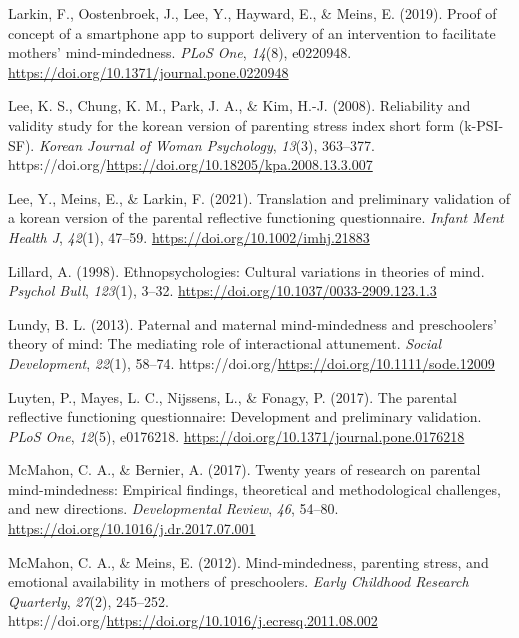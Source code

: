 \documentclass[
]{article}
\newlength{\cslhangindent}
\newlength{\cslentryspacingunit} %
\newenvironment{CSLReferences}[2] %
 {%
  \setlength{\parindent}{0pt}
  \ifodd #1
  \let\oldpar\par
  \def\par{\hangindent=\cslhangindent\oldpar}
  \fi
  \setlength{\parskip}{#2\cslentryspacingunit}
 }%
 {}
\begin{document}
\begin{CSLReferences}{1}{0}
\leavevmode{}%
Larkin, F., Oostenbroek, J., Lee, Y., Hayward, E., \& Meins, E. (2019). Proof of concept of a smartphone app to support delivery of an intervention to facilitate mothers' mind-mindedness. \emph{PLoS One}, \emph{14}(8), e0220948. \url{https://doi.org/10.1371/journal.pone.0220948}

\leavevmode{}%
Lee, K. S., Chung, K. M., Park, J. A., \& Kim, H.-J. (2008). Reliability and validity study for the korean version of parenting stress index short form (k-PSI-SF). \emph{Korean Journal of Woman Psychology}, \emph{13}(3), 363--377. https://doi.org/\url{https://doi.org/10.18205/kpa.2008.13.3.007}

\leavevmode{}%
Lee, Y., Meins, E., \& Larkin, F. (2021). Translation and preliminary validation of a korean version of the parental reflective functioning questionnaire. \emph{Infant Ment Health J}, \emph{42}(1), 47--59. \url{https://doi.org/10.1002/imhj.21883}

\leavevmode{}%
Lillard, A. (1998). Ethnopsychologies: Cultural variations in theories of mind. \emph{Psychol Bull}, \emph{123}(1), 3--32. \url{https://doi.org/10.1037/0033-2909.123.1.3}

\leavevmode{}%
Lundy, B. L. (2013). Paternal and maternal mind-mindedness and preschoolers' theory of mind: The mediating role of interactional attunement. \emph{Social Development}, \emph{22}(1), 58--74. https://doi.org/\url{https://doi.org/10.1111/sode.12009}

\leavevmode{}%
Luyten, P., Mayes, L. C., Nijssens, L., \& Fonagy, P. (2017). The parental reflective functioning questionnaire: Development and preliminary validation. \emph{PLoS One}, \emph{12}(5), e0176218. \url{https://doi.org/10.1371/journal.pone.0176218}

\leavevmode{}%
McMahon, C. A., \& Bernier, A. (2017). Twenty years of research on parental mind-mindedness: Empirical findings, theoretical and methodological challenges, and new directions. \emph{Developmental Review}, \emph{46}, 54--80. \url{https://doi.org/10.1016/j.dr.2017.07.001}

\leavevmode{}%
McMahon, C. A., \& Meins, E. (2012). Mind-mindedness, parenting stress, and emotional availability in mothers of preschoolers. \emph{Early Childhood Research Quarterly}, \emph{27}(2), 245--252. https://doi.org/\url{https://doi.org/10.1016/j.ecresq.2011.08.002}


\end{CSLReferences}
\end{document}
